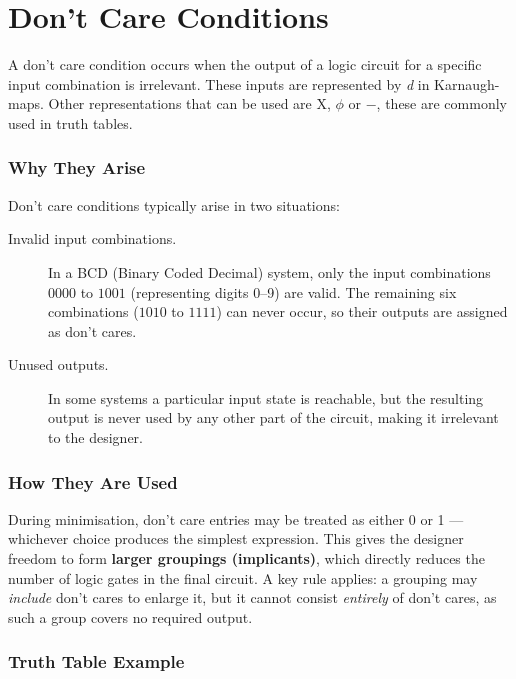 \section{Don't Care Conditions}

\begin{definition}
A don't care condition occurs when the output of a logic circuit for a
specific input combination is irrelevant. These inputs are represented by \textit{d}
in Karnaugh-maps. Other representations that can be used are X, $\phi$
or $-$, these are commonly used in truth tables.
\end{definition}

\subsubsection{Why They Arise}

Don't care conditions typically arise in two situations:

\begin{description}
    \item[Invalid input combinations.] In a BCD (Binary Coded Decimal)
    system, only the input combinations \(0000\) to \(1001\) (representing
    digits 0--9) are valid. The remaining six combinations (\(1010\) to
    \(1111\)) can never occur, so their outputs are assigned as don't cares.

    \item[Unused outputs.] In some systems a particular input state is
    reachable, but the resulting output is never used by any other part of
    the circuit, making it irrelevant to the designer.
\end{description}

\subsubsection{How They Are Used}

During minimisation, don't care entries may be treated as either 0 or 1 —
whichever choice produces the simplest expression. This gives the designer
freedom to form \textbf{larger groupings (implicants)}, which directly
reduces the number of logic gates in the final circuit. A key rule applies:
a grouping may \emph{include} don't cares to enlarge it, but it cannot
consist \emph{entirely} of don't cares, as such a group covers no required
output.

\subsubsection{Truth Table Example}

